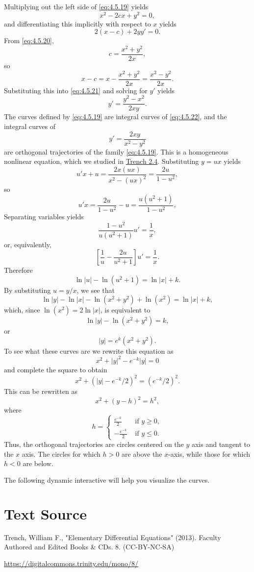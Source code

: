 \documentclass{ximera}
\begin{document}
\begin{example}
\begin{explanation}
Multiplying out the left side of \eqref{eq:4.5.19} yields
\begin{equation} \label{eq:4.5.20}
x^2-2cx+y^2=0,
\end{equation}
and differentiating this implicitly with respect to $x$ yields
\begin{equation} \label{eq:4.5.21}
2(x-c)+2yy'=0.
\end{equation}
 From \eqref{eq:4.5.20},
$$
c=\frac{x^2+y^2}{2x},
$$
so
$$
x-c=x-\frac{x^2+y^2}{2x}=\frac{x^2-y^2}{2x}.
$$
Substituting this into \eqref{eq:4.5.21} and solving for $y'$ yields
\begin{equation} \label{eq:4.5.22}
y'=\frac{y^2-x^2}{2xy}.
\end{equation}
The curves defined by \eqref{eq:4.5.19} are integral curves of
\eqref{eq:4.5.22}, and the integral curves of
$$
y'=\frac{2xy}{x^2-y^2}
$$
are orthogonal trajectories of the family \eqref{eq:4.5.19}. This is a
homogeneous nonlinear equation, which we studied in
\href{https://ximera.osu.edu/ode/main/nonlinearToSeparable/nonlinearToSeparable}{Trench 2.4}. Substituting $y=ux$ yields
$$
u'x+u=\frac{2x(ux)}{x^2-(ux)^2}=\frac{2u}{1-u^2},
$$
so
$$
u'x=\frac{2u}{1-u^2}-u=\frac{u(u^2+1)}{1-u^2},
$$
Separating variables yields
$$
\frac{1-u^2}{u(u^2+1)}u'=\frac{1}{x},
$$
or, equivalently,
$$
\left[\frac{1}{u}-\frac{2u}{u^2+1}\right]u'=\frac{1}{x}.
$$
Therefore
$$
\ln |u|-\ln (u^2+1)=\ln |x|+k.
$$
By substituting $u=y/x$, we see that
$$
\ln|y|-\ln|x|-\ln(x^2+y^2)+\ln(x^2)=\ln|x|+k,
$$
which, since $\ln(x^2)=2\ln|x|$, is equivalent to
$$
\ln|y|-\ln(x^2+y^2)=k,
$$
or
$$
|y|=e^k(x^2+y^2).
$$
To see what these curves are we rewrite this equation as
$$
x^2+|y|^2-e^{-k}|y|=0
$$
and complete the square to obtain
$$
x^2+(|y|-e^{-k}/2)^2=(e^{-k}/2)^2.
$$
This can be rewritten as
$$
x^2+(y-h)^2=h^2,
$$
where
$$
h=\left\{\begin{array}{rl} \frac{e^{-k}}{2}&\mbox{ if } y\geq
0,\\-\frac{e^{-k}}{2}&\mbox{ if } y\leq 0. \end{array}\right.
$$
Thus, the orthogonal trajectories are circles centered on the $y$ axis
and tangent to the $x$ axis. The circles
for which $h>0$ are above the $x$-axis, while those for which $h<0$
are below.


 

The following dynamic interactive will help you visualize the curves.

\begin{center}  
\end{center}

 
\end{explanation}
\end{example}
 
 
\section*{Text Source}
Trench, William F., "Elementary Differential Equations" (2013). Faculty Authored and Edited Books \& CDs. 8. (CC-BY-NC-SA)
 
\href{https://digitalcommons.trinity.edu/mono/8/}{https://digitalcommons.trinity.edu/mono/8/}
 
 
\end{document}
